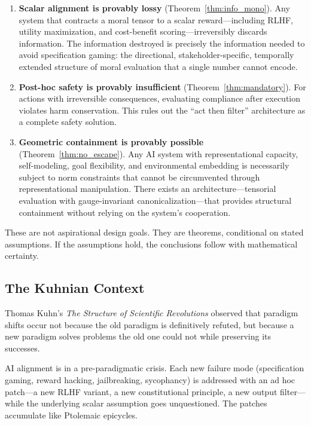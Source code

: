 \documentclass[12pt,letterpaper]{article}
\theoremstyle{definition}
\theoremstyle{remark}
\begin{document}
\begin{enumerate}
    \item \textbf{Scalar alignment is provably lossy} (Theorem~\ref{thm:info_mono}). Any system that contracts a moral tensor to a scalar reward---including RLHF, utility maximization, and cost-benefit scoring---irreversibly discards information. The information destroyed is precisely the information needed to avoid specification gaming: the directional, stakeholder-specific, temporally extended structure of moral evaluation that a single number cannot encode.
    \item \textbf{Post-hoc safety is provably insufficient} (Theorem~\ref{thm:mandatory}). For actions with irreversible consequences, evaluating compliance after execution violates harm conservation. This rules out the ``act then filter'' architecture as a complete safety solution.
    \item \textbf{Geometric containment is provably possible} (Theorem~\ref{thm:no_escape}). Any AI system with representational capacity, self-modeling, goal flexibility, and environmental embedding is necessarily subject to norm constraints that cannot be circumvented through representational manipulation. There exists an architecture---tensorial evaluation with gauge-invariant canonicalization---that provides structural containment without relying on the system's cooperation.
\end{enumerate}

These are not aspirational design goals. They are theorems, conditional on stated assumptions. If the assumptions hold, the conclusions follow with mathematical certainty.

\subsection{The Kuhnian Context}

Thomas Kuhn's \emph{The Structure of Scientific Revolutions} \cite{kuhn1962} observed that paradigm shifts occur not because the old paradigm is definitively refuted, but because a new paradigm solves problems the old one could not while preserving its successes.

AI alignment is in a pre-paradigmatic crisis. Each new failure mode (specification gaming, reward hacking, jailbreaking, sycophancy) is addressed with an ad hoc patch---a new RLHF variant, a new constitutional principle, a new output filter---while the underlying scalar assumption goes unquestioned. The patches accumulate like Ptolemaic epicycles.
\end{document}
